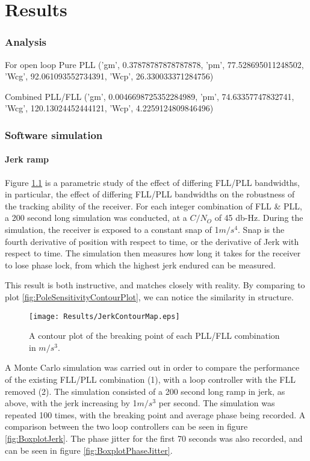 \chapter{Results}\label{ch:Results}

\subsection{Analysis}

For open loop
Pure PLL
('gm', 0.37878787878787878, 'pm', 77.528695011248502, 'Wcg', 92.061093552734391, 'Wcp', 26.330033371284756)

Combined PLL/FLL
('gm', 0.0046698725352284989, 'pm', 74.63357747832741, 'Wcg', 120.13024452444121, 'Wcp', 4.2259124809846496)


\subsection{Software simulation}

\subsubsection{Jerk ramp}

Figure \ref{fig:JerkContourMap} is a parametric study of the effect of differing FLL/PLL bandwidths, in particular, the effect of differing FLL/PLL bandwidths on the robustness of the tracking ability of the receiver. For each integer combination of FLL \& PLL, a 200 second long simulation was conducted, at a $C/N_O$ of 45 db-Hz. During the simulation, the receiver is exposed to a constant snap of 1$m/s^4$. Snap is the fourth derivative of position with respect to time, or the derivative of Jerk with respect to time. The simulation then measures how long it takes for the receiver to lose phase lock, from which the highest jerk endured can be measured. 

This result is both instructive, and matches closely with reality. By comparing to plot \ref{fig:PoleSensitivityContourPlot}, we can notice the similarity in structure. 


\begin{figure}[!htb] 
    \centering
    \texttt{[image: Results/JerkContourMap.eps]} 
    \caption{A contour plot of the breaking point of each PLL/FLL combination in $m/s^3$.}
    \label{fig:JerkContourMap}
\end{figure}

A Monte Carlo simulation was carried out in order to compare the performance of the existing FLL/PLL combination (1), with a loop controller with the FLL removed (2). The simulation consisted of a 200 second long ramp in jerk, as above, with the jerk increasing by 1$m/s^3$ per second. The simulation was repeated 100 times, with the breaking point and average phase being recorded. A comparison between the two loop controllers can be seen in figure \ref{fig:BoxplotJerk}. The phase jitter for the first 70 seconds was also recorded, and can be seen in figure \ref{fig:BoxplotPhaseJitter}. 


